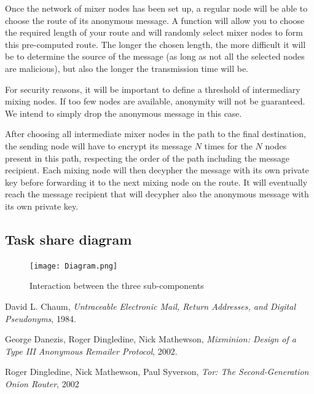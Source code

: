 \documentclass[11pt, a4paper]{article}
\begin{document}
            Once the network of mixer nodes has been set up, a regular node will be able to choose the route of its anonymous message.
            A function will allow you to choose the required length of your route and will randomly select mixer nodes to form this pre-computed route.
            The longer the chosen length, the more difficult it will be to determine the source of the message (as long as not all the selected nodes are malicious), but also the longer the transmission time will be.

            For security reasons, it will be important to define a threshold of intermediary mixing nodes.
            If too few nodes are available, anonymity will not be guaranteed.
            We intend to simply drop the anonymous message in this case.

            After choosing all intermediate mixer nodes in the path to the final destination, the sending node will have to encrypt its message $N$ times for the $N$ nodes present in this path, respecting the order of the path including the message recipient.
            Each mixing node will then decypher the message with its own private key before forwarding it to the next mixing node on the route.
            It will eventually reach the message recipient that will decypher also the anonymous message with its own private key.

    \subsection{Task share diagram}


\begin{figure}[h!]
  \texttt{[image: Diagram.png]}
  \caption{Interaction between the three sub-components}
  \label{fig:taskdiagram}
\end{figure}


\begin{thebibliography}{9}

  David L. Chaum,
  \textit{Untraceable Electronic Mail, Return Addresses, and Digital Pseudonyms},
  1984.

  George Danezis, Roger Dingledine, Nick Mathewson,
  \textit{Mixminion: Design of a Type III Anonymous Remailer Protocol},
  2002.

    Roger Dingledine, Nick Mathewson, Paul Syverson,
    \textit{Tor: The Second-Generation Onion Router},
    2002

\end{thebibliography}
\end{document}
